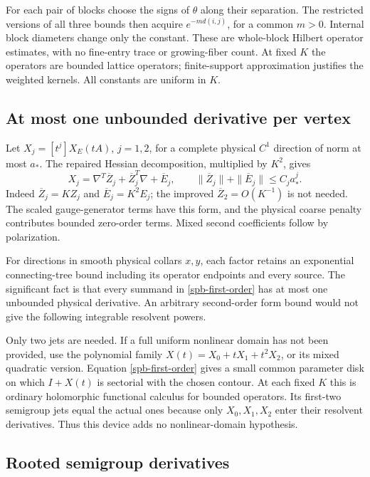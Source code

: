 \documentclass[11pt]{article}
\theoremstyle{remark}
\begin{document}
For each pair of blocks choose the signs of $\theta$ along their
separation. The restricted versions of all three bounds then acquire
$e^{-m d(i,j)}$, for a common $m>0$. Internal block diameters change
only the constant. These are whole-block Hilbert operator estimates,
with no fine-entry trace or growing-fiber count. At fixed $K$ the
operators are bounded lattice operators; finite-support approximation
justifies the weighted kernels. All constants are uniform in $K$.

\subsection{At most one unbounded derivative per vertex}
\label{spb-vertices}

Let $X_j=[t^j]X_E(tA)$, $j=1,2$, for a complete physical $C^1$
direction of norm at most $a_*$. The repaired Hessian decomposition,
multiplied by $K^2$, gives
\begin{equation}
 X_j=\nabla^T\overline Z_j+\overline Z_j^T\nabla
                  +\overline E_j,
 \qquad
 \|\overline Z_j\|+\|\overline E_j\|\le C_j a_*^j.
 \label{spb-first-order}
\end{equation}
Indeed $\overline Z_j=KZ_j$ and $\overline E_j=K^2E_j$;
the improved $\overline Z_2=O(K^{-1})$ is not needed.
The scaled gauge-generator terms have this form, and the physical
coarse penalty contributes bounded zero-order terms. Mixed second
coefficients follow by polarization.

For directions in smooth physical collars $x,y$, each factor retains
an exponential connecting-tree bound including its operator endpoints
and every source. The significant fact is that every summand in
\eqref{spb-first-order} has at most one unbounded physical derivative.
An arbitrary second-order form bound would not give the following
integrable resolvent powers.

Only two jets are needed. If a full uniform nonlinear domain has not
been provided, use the polynomial family
$X(t)=X_0+tX_1+t^2X_2$, or its mixed quadratic version.
Equation \eqref{spb-first-order} gives a small common parameter disk
on which $I+X(t)$ is sectorial with the chosen contour. At each fixed
$K$ this is ordinary holomorphic functional calculus for bounded
operators. Its first-two semigroup jets equal the actual ones because
only $X_0,X_1,X_2$ enter their resolvent derivatives. Thus this device
adds no nonlinear-domain hypothesis.

\subsection{Rooted semigroup derivatives}
\label{spb-semigroup}
\end{document}
